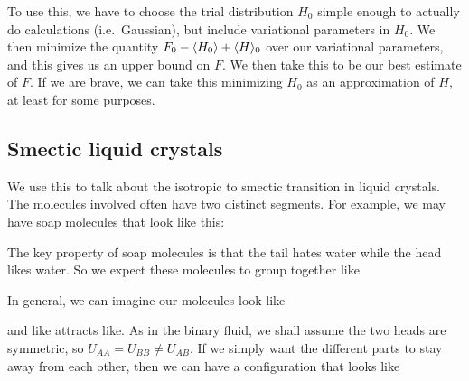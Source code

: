 \documentclass[a4paper]{article}
\begin{document}
To use this, we have to choose the trial distribution $H_0$ simple enough to actually do calculations (i.e.\ Gaussian), but include variational parameters in $H_0$. We then minimize the quantity $F_0 - \langle H_0\rangle + \langle H\rangle_0$ over our variational parameters, and this gives us an upper bound on $F$. We then take this to be our best estimate of $F$. If we are brave, we can take this minimizing $H_0$ as an approximation of $H$, at least for some purposes.

\subsection{Smectic liquid crystals}
We use this to talk about the isotropic to smectic transition in liquid crystals. The molecules involved often have two distinct segments. For example, we may have soap molecules that look like this:
\begin{center}
\end{center}
The key property of soap molecules is that the tail hates water while the head likes water. So we expect these molecules to group together like
\begin{center}
\end{center}
In general, we can imagine our molecules look like
\begin{center}
\end{center}
and like attracts like. As in the binary fluid, we shall assume the two heads are symmetric, so $U_{AA} = U_{BB} \not= U_{AB}$. If we simply want the different parts to stay away from each other, then we can have a configuration that looks like
\begin{center}
\end{center}
\end{document}
